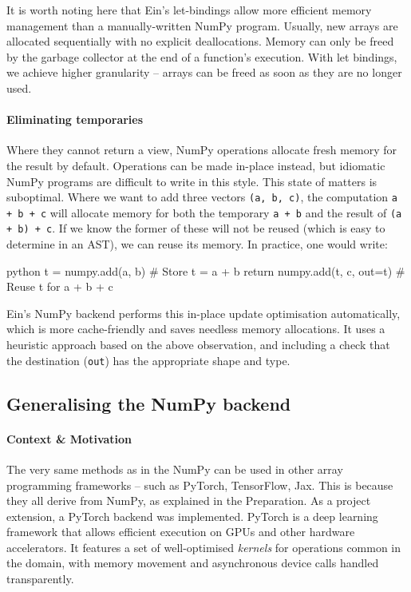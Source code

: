 It is worth noting here that Ein's let-bindings allow more efficient memory management than a manually-written NumPy program. Usually, new arrays are allocated sequentially with no explicit deallocations. Memory can only be freed by the garbage collector at the end of a function's execution. With let bindings, we achieve higher granularity -- arrays can be freed as soon as they are no longer used.

\paragraph{Eliminating temporaries} Where they cannot return a view, NumPy operations allocate fresh memory for the result by default. Operations can be made in-place instead, but idiomatic NumPy programs are difficult to write in this style. 
This state of matters is suboptimal. Where we want to add three vectors \texttt{(a, b, c)}, the computation \texttt{a + b + c} will allocate memory for both the temporary \texttt{a + b} and the result of \texttt{(a + b) + c}. If we know the former of these will not be reused (which is easy to determine in an AST), we can reuse its memory. In practice, one would write:
\begin{center}
\begin{cminted}{python}
t = numpy.add(a, b)            # Store t = a + b
return numpy.add(t, c, out=t)  # Reuse t for a + b + c
\end{cminted}
\end{center}
Ein's NumPy backend performs this in-place update optimisation automatically, which is more cache-friendly and saves needless memory allocations. It uses a heuristic approach based on the above observation, and including a check that the destination (\texttt{out}) has the appropriate shape and type.

\subsection{Generalising the NumPy backend}

\paragraph{Context \& Motivation} The very same methods as in the NumPy can be used in other array programming frameworks -- such as PyTorch, TensorFlow, Jax. This is because they all derive from NumPy, as explained in the Preparation. As a project extension, a PyTorch backend was implemented. PyTorch is a deep learning framework that allows efficient execution on GPUs and other hardware accelerators. It features a set of well-optimised \textit{kernels} for operations common in the domain, with memory movement and asynchronous device calls handled transparently.

